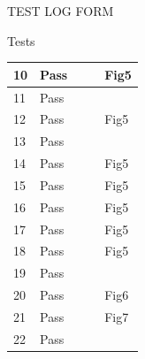 \documentclass{article}
\begin{document}
\begin{section}{TEST LOG FORM}
\begin{subsection}{Tests}
\begin{tabularx}{\linewidth}{| p{1.5cm} | p{2cm} | p{7.5cm} | p{2cm} | X |}
\\
\hline

10
&
Pass
&

&

&
Fig5
\\
\hline

11
&
Pass
&

&

&

\\
\hline

12
&
Pass
&

&

&
Fig5
\\
\hline

13
&
Pass 
&

&

&

\\
\hline

14
&
Pass
&

&

&
Fig5
\\
\hline

15
&
Pass
&

&

&
Fig5
\\
\hline

16
&
Pass
&

&

&
Fig5
\\
\hline

17
&
Pass
&

&

&
Fig5
\\
\hline

18
&
Pass
&

&

&
Fig5
\\
\hline

19
&
Pass
&

&

&

\\
\hline

20
&
Pass
&

&

&
Fig6
\\
\hline

21
&
Pass
&

&

&
Fig7
\\
\hline

22
&
Pass
&

&


\end{tabularx}
\end{subsection}
\end{section}
\end{document}
